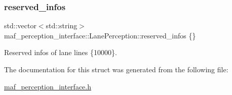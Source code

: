 \subsubsection{\texorpdfstring{reserved\+\_\+infos}{reserved\_infos}}
{\footnotesize\ttfamily std\+::vector$<$std\+::string$>$ maf\+\_\+perception\+\_\+interface\+::\+Lane\+Perception\+::reserved\+\_\+infos \{\}}



Reserved infos of lane lines \{10000\}. 



The documentation for this struct was generated from the following file\+:\begin{DoxyCompactItemize}
\item 
\hyperlink{maf__perception__interface_8h}{maf\+\_\+perception\+\_\+interface.\+h}\end{DoxyCompactItemize}
